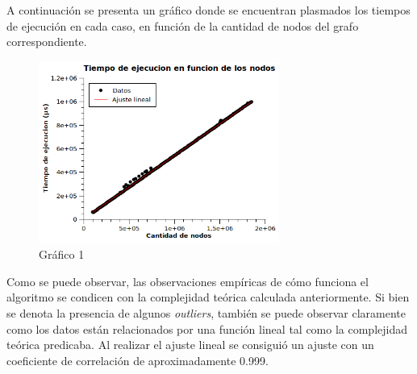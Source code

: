 \documentclass[a4paper, 12pt]{article}
\begin{document}
A continuación se presenta un gráfico donde se encuentran plasmados los tiempos de ejecución en cada caso, en función de la cantidad de nodos del grafo correspondiente.

\begin{figure}[H]
\centering
\includegraphics[width=0.7\textwidth]{imagenes/Resultados2.png} 
\caption{Gráfico 1}
\end{figure}


Como se puede observar, las observaciones empíricas de cómo funciona el algoritmo se condicen con la complejidad teórica
calculada anteriormente. Si bien se denota la presencia de algunos \emph{outliers}, también se puede observar claramente
como los datos están relacionados por una función lineal tal como la complejidad teórica predicaba. Al realizar el ajuste lineal
se consiguió un ajuste con un coeficiente de correlación de aproximadamente 0.999.
\end{document}
